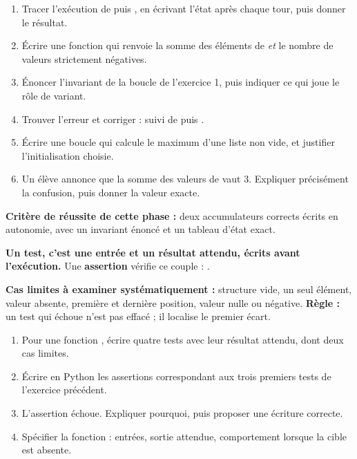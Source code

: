 \documentclass[10pt,a4paper]{article}
\begin{document}
\begin{enumerate}
\needspace{18mm}
\item Tracer l'exécution de  puis , en écrivant l'état après chaque tour, puis donner le résultat.
\needspace{18mm}
\item Écrire une fonction  qui renvoie la somme des éléments de  \emph{et} le nombre de valeurs strictement négatives.
\needspace{18mm}
\item Énoncer l'invariant de la boucle de l'exercice 1, puis indiquer ce qui joue le rôle de variant.
\needspace{18mm}
\item Trouver l'erreur et corriger :  suivi de  puis .
\needspace{18mm}
\item Écrire une boucle qui calcule le maximum d'une liste non vide, et justifier l'initialisation choisie.
\needspace{18mm}
\item Un élève annonce que la somme des valeurs de  vaut $3$. Expliquer précisément la confusion, puis donner la valeur exacte.
\end{enumerate}
\begin{successbox}\textbf{Critère de réussite de cette phase :} deux accumulateurs corrects écrits en autonomie, avec un invariant énoncé et un tableau d'état exact.\end{successbox}
\certline
\needspace{62mm}\par\vspace{3mm}
\begin{methodbox}
\textbf{Un test, c'est une entrée et un résultat attendu, écrits avant l'exécution.}
Une \textbf{assertion} vérifie ce couple : .
\par\smallskip
\textbf{Cas limites à examiner systématiquement :} structure vide, un seul élément, valeur absente,
première et dernière position, valeur nulle ou négative.
\textbf{Règle :} un test qui échoue n'est pas effacé ; il localise le premier écart.
\end{methodbox}
\begin{enumerate}
\needspace{18mm}
\item Pour une fonction , écrire quatre tests avec leur résultat attendu, dont deux cas limites.
\needspace{18mm}
\item Écrire en Python les assertions correspondant aux trois premiers tests de l'exercice précédent.
\needspace{18mm}
\item L'assertion  échoue. Expliquer pourquoi, puis proposer une écriture correcte.
\needspace{18mm}
\item Spécifier la fonction  : entrées, sortie attendue, comportement lorsque la cible est absente.
\end{enumerate}
\end{document}
